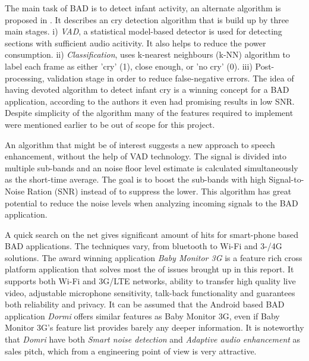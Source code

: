 The main task of BAD is to detect infant activity, an alternate algorithm is
proposed in \cite{infantDetec}.  It describes an cry detection algorithm that
is build up by three main stages. i) \emph{VAD}, a statistical model-based
detector \cite{statis} is used for detecting sections with sufficient audio
acitivity. It also helps to reduce the power consumption. ii)
\emph{Classification}, uses k-nearest neighbours (k-NN) algorithm \cite{k-NN}
to label each frame as either 'cry' (1), close enough, or 'no cry' (0). iii)
Post-processing, validation stage in order to reduce false-negative errors. The
idea of having devoted algorithm to detect infant cry is a winning concept for
a BAD application, according to the authors it even had promising results in
low SNR. Despite simplicity of the algorithm many of the features required to
implement were mentioned earlier to be out of scope for this project.

An algorithm that might be of interest \cite{blekinge} suggests a new approach
to speech enhancement, without the help of VAD technology. The signal is
divided into multiple sub-bands and an noise floor level estimate is calculated
simultaneously as the short-time average. The goal is to boost the sub-bands
with high Signal-to-Noise Ration (SNR) instead of to suppress the lower. This
algorithm has great potential to reduce the noise levels when analyzing
incoming signals to the BAD application. 

A quick search on the net gives significant amount of hits for smart-phone
based BAD applications. The techniques vary, from bluetooth to Wi-Fi and 3-/4G
solutions. The award winning application \emph{Baby Monitor 3G} \cite{bm3G} is
a feature rich cross platform application that solves most the of issues
brought up in this report. It supports both Wi-Fi and 3G/LTE networks, ability
to transfer high quality live video, adjustable microphone sensitivity,
talk-back functionality and guarantees both reliability and privacy. It can
be assumed that the Android based BAD application \emph{Dormi}
\cite{sleekbit} offers similar features as Baby Monitor 3G, even if Baby
Monitor 3G's feature list provides barely any deeper information. It is
noteworthy that \emph{Domri} have both \emph{Smart noise detection} and
\emph{Adaptive audio enhancement} as sales pitch, which from a engineering
point of view is very attractive. 

